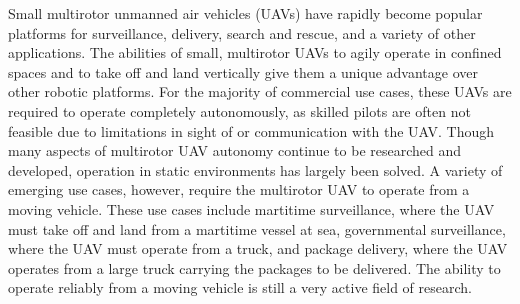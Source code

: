 
Small multirotor unmanned air vehicles (UAVs) have rapidly become popular platforms for
surveillance, delivery, search and rescue, and a variety of other applications.
The abilities of small, multirotor UAVs to agily operate in confined spaces and to
take off and land vertically give them a unique advantage over other robotic
platforms. For the majority of commercial use cases, these UAVs are required to operate
completely autonomously, as skilled pilots are often not feasible due to
limitations in sight of or communication with the UAV. Though many aspects of
multirotor UAV autonomy continue to be researched and developed, operation in
static environments has largely been solved. A variety of emerging use cases,
however, require the multirotor UAV to operate from a moving vehicle. These use
cases include martitime surveillance, where the UAV must take off and land from
a martitime vessel at sea, governmental surveillance, where the UAV must operate
from a truck, and package delivery, where the UAV operates from a large truck
carrying the packages to be delivered. The ability to operate reliably from a
moving vehicle is still a very active field of research.


